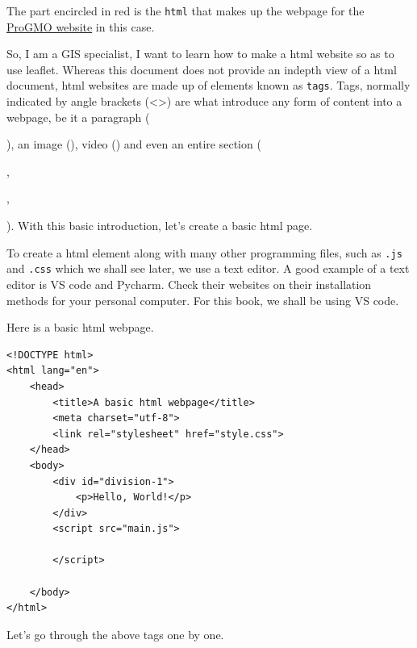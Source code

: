 \documentclass[
]{book}
\theoremstyle{definition}
\theoremstyle{definition}
\theoremstyle{definition}
\theoremstyle{definition}
\theoremstyle{remark}
\begin{document}
The part encircled in red is the \texttt{html} that makes up the webpage for the \href{https://sammigachuhi.github.io/pro-gmo-website/}{ProGMO website} in this case.

So, I am a GIS specialist, I want to learn how to make a html website so as to use leaflet. Whereas this document does not provide an indepth view of a html document, html websites are made up of elements known as \texttt{tags}. Tags, normally indicated by angle brackets (\textless\textgreater) are what introduce any form of content into a webpage, be it a paragraph (

), an image (), video () and even an entire section (

,

,

). With this basic introduction, let's create a basic html page.

To create a html element along with many other programming files, such as \texttt{.js} and \texttt{.css} which we shall see later, we use a text editor. A good example of a text editor is VS code and Pycharm. Check their websites on their installation methods for your personal computer. For this book, we shall be using VS code.

Here is a basic html webpage.

\begin{verbatim}
<!DOCTYPE html>
<html lang="en">
    <head>
        <title>A basic html webpage</title>
        <meta charset="utf-8">
        <link rel="stylesheet" href="style.css">
    </head>
    <body>
        <div id="division-1">
            <p>Hello, World!</p>
        </div>
        <script src="main.js">

        </script>

    </body>
</html>
\end{verbatim}

Let's go through the above tags one by one.
\end{document}
